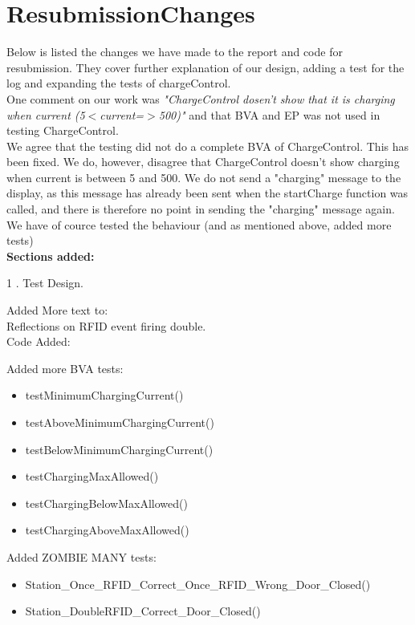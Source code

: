 \section{ResubmissionChanges}

Below is listed the changes we have made to the report and code for resubmission.
They cover further explanation of our design, adding a test for the log and expanding the tests of chargeControl.\\

One comment on our work was \emph{"ChargeControl dosen't show that it is charging when current (5$<$current=$>$500)"} and that BVA and EP was not used in testing ChargeControl.\\

We agree that the testing did not do a complete BVA of ChargeControl. This has been fixed. We do, however, disagree that ChargeControl doesn't show charging when current is between 5 and 500. We do not send a "charging" message to the display, as this message has already been sent when the startCharge function was called, and there is therefore no point in sending the "charging" message again.\\

We have of cource tested the behaviour (and as mentioned above, added more tests) \\


\textbf{Sections added:}

1 . Test Design. 

Added More text to:\\

Reflections on RFID event firing double.\\ 

Code Added: 

Added more BVA tests:
\begin{itemize}
\item testMinimumChargingCurrent()
\item testAboveMinimumChargingCurrent()
\item testBelowMinimumChargingCurrent()
\item testChargingMaxAllowed()
\item testChargingBelowMaxAllowed()
\item testChargingAboveMaxAllowed()
\end{itemize}


Added ZOMBIE MANY tests: 
\begin{itemize}
\item Station\_Once\_RFID\_Correct\_Once\_RFID\_Wrong\_Door\_Closed()
\item Station\_DoubleRFID\_Correct\_Door\_Closed()
\end{itemize}